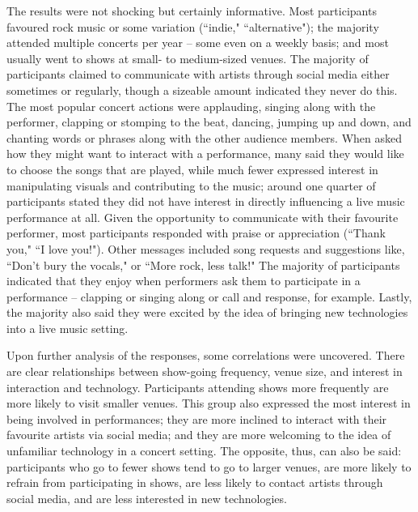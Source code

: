 The results were not shocking but certainly informative. Most participants favoured rock music or some variation (``indie," ``alternative"); the majority attended multiple concerts per year -- some even on a weekly basis; and most usually went to shows at small- to medium-sized venues. The majority of participants claimed to communicate with artists through social media either sometimes or regularly, though a sizeable amount indicated they never do this. The most popular concert actions were applauding, singing along with the performer, clapping or stomping to the beat, dancing, jumping up and down, and chanting words or phrases along with the other audience members. When asked how they might want to interact with a performance, many said they would like to choose the songs that are played, while much fewer expressed interest in manipulating visuals and contributing to the music; around one quarter of participants stated they did not have interest in directly influencing a live music performance at all. Given the opportunity to communicate with their favourite performer, most participants responded with praise or appreciation (``Thank you," ``I love you!"). Other messages included song requests and suggestions like, ``Don't bury the vocals," or ``More rock, less talk!" The majority of participants indicated that they enjoy when performers ask them to participate in a performance -- clapping or singing along or call and response, for example. Lastly, the majority also said they were excited by the idea of bringing new technologies into a live music setting.

Upon further analysis of the responses, some correlations were uncovered. There are clear relationships between show-going frequency, venue size, and interest in interaction and technology. Participants attending shows more frequently are more likely to visit smaller venues. This group also expressed the most interest in being involved in performances; they are more inclined to interact with their favourite artists via social media; and they are more welcoming to the idea of unfamiliar technology in a concert setting. The opposite, thus, can also be said: participants who go to fewer shows tend to go to larger venues, are more likely to refrain from participating in shows, are less likely to contact artists through social media, and are less interested in new technologies.

